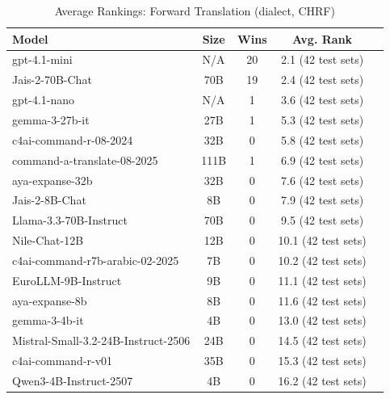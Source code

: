 \begin{table}[htbp]
\centering
\caption{Average Rankings: Forward Translation (dialect, CHRF)}
\label{tab:avg_rankings_chrf_dialect}
\begin{tabular}{l@{\hspace{3pt}}c@{\hspace{3pt}}c@{\hspace{3pt}}c@{\hspace{3pt}}c}
\toprule
Model & Size & Wins & Avg. Rank \\
\midrule
gpt-4.1-mini & N/A & 20 & 2.1 (42 test sets) \\
Jais-2-70B-Chat & 70B & 19 & 2.4 (42 test sets) \\
gpt-4.1-nano & N/A & 1 & 3.6 (42 test sets) \\
gemma-3-27b-it & 27B & 1 & 5.3 (42 test sets) \\
c4ai-command-r-08-2024 & 32B & 0 & 5.8 (42 test sets) \\
command-a-translate-08-2025 & 111B & 1 & 6.9 (42 test sets) \\
aya-expanse-32b & 32B & 0 & 7.6 (42 test sets) \\
Jais-2-8B-Chat & 8B & 0 & 7.9 (42 test sets) \\
Llama-3.3-70B-Instruct & 70B & 0 & 9.5 (42 test sets) \\
Nile-Chat-12B & 12B & 0 & 10.1 (42 test sets) \\
c4ai-command-r7b-arabic-02-2025 & 7B & 0 & 10.2 (42 test sets) \\
EuroLLM-9B-Instruct & 9B & 0 & 11.1 (42 test sets) \\
aya-expanse-8b & 8B & 0 & 11.6 (42 test sets) \\
gemma-3-4b-it & 4B & 0 & 13.0 (42 test sets) \\
Mistral-Small-3.2-24B-Instruct-2506 & 24B & 0 & 14.5 (42 test sets) \\
c4ai-command-r-v01 & 35B & 0 & 15.3 (42 test sets) \\
Qwen3-4B-Instruct-2507 & 4B & 0 & 16.2 (42 test sets) \\
\bottomrule
\end{tabular}
\end{table}
